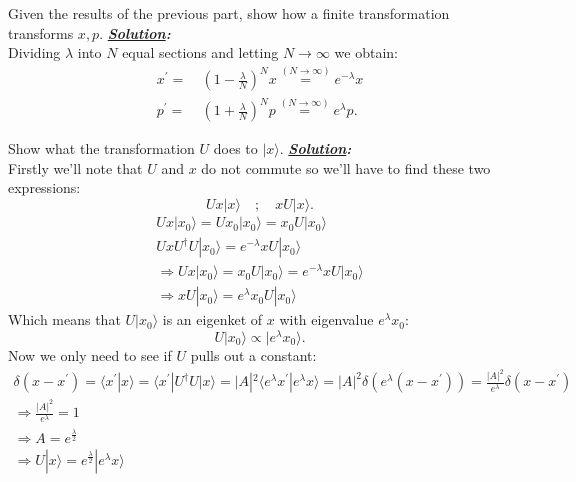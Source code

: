 \documentclass[notitlepage]{report}
\begin{document}
\begin{question}[title = Part 2]{}{}
Given the results of the previous part, show how a finite transformation transforms $x, p$.
\tcblower
\textbf{\emph{\underline{Solution}:}}\\
Dividing $\lambda$ into $N$ equal sections and letting $N\longrightarrow\infty$ we obtain:\\
 \begin{align*}
	x^\prime =&\ \left(1-\frac{\lambda}{N}\right)^{N}x\overset{\left(N\rightarrow\infty\right) }{=}e^{-\lambda}x\\
	p^\prime =&\ \left(1+\frac{\lambda}{N}\right)^{N}p\overset{\left(N\rightarrow\infty\right) }{=}e^{\lambda}p 
.\end{align*}
\end{question}
\begin{question}[title = Part 3]{}{}
Show what the transformation $U$ does to $|x\rangle $.
\tcblower
\textbf{\emph{\underline{Solution}:}}\\
Firstly we'll note that $U$ and $x$ do not commute so we'll have to find these two expressions:\\
\[
	Ux|x\rangle \quad;\quad xU|x\rangle 
.\] 
\begin{gather*}
	Ux|x_0\rangle=Ux_0|x_0\rangle=x_0U|x_0\rangle\\
	UxU^{\dag}U|x_0\rangle=e^{-\lambda}xU|x_0\rangle\\
	\Rightarrow Ux|x_0\rangle=x_0U|x_0\rangle=e^{-\lambda}xU|x_0\rangle\\
	\Rightarrow xU|x_0\rangle=e^{\lambda}x_0U|x_0\rangle  
\end{gather*}
Which means that $U|x_0\rangle $ is an eigenket of $x$ with eigenvalue $e^{\lambda}x_0$:\\
\[
	U|x_0\rangle\propto|e^{\lambda}x_0\rangle 
.\] 
\tcbbreak
Now we only need to see if $U$ pulls out a constant:\\
\begin{gather*}
\delta\left(x-x^\prime\right)=\langle x^\prime|x\rangle=\langle x^\prime|U^{\dag}U|x\rangle=|A|^2\langle e^{\lambda}x^\prime|e^{\lambda}x\rangle=|A|^2\delta\left(e^{\lambda}\left(x-x^\prime\right) \right) =\frac{|A|^2}{e^{\lambda}}\delta\left(x-x^\prime \right)\\
\Rightarrow \frac{|A|^2}{e^{\lambda}}=1\\
\Rightarrow A=e^{\frac{\lambda}{2}}\\
\Rightarrow \boxed{U|x\rangle=e^{\frac{\lambda}{2}}|e^{\lambda}x\rangle} 
\end{gather*}
\end{question}
\end{document}
